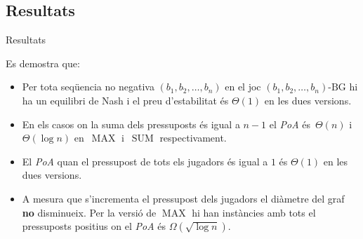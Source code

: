\documentclass[aspectratio=169]{beamer}
\DeclareMathOperator{\SUM}{SUM}
\DeclareMathOperator{\MAX}{MAX}
\begin{document}
\subsection{Resultats}
\begin{frame}[allowframebreaks]{Resultats}



Es demostra que:
\begin{itemize}
    \item Per tota seqüencia no negativa $ (b_1, b_2, \dots , b_n)$ en el joc $ (b_1, b_2, \dots , b_n)\text{-BG} $ hi ha un equilibri de Nash i el preu d'estabilitat és $\Theta(1)$ en les dues versions.
    
    \vspace{1em}
    
    \item En els casos on la suma dels pressuposts és igual a $n-1$ el \emph{PoA}
    és~$\Theta(n)$ i~$\Theta(\log n)$ en~$\MAX$ i~$\SUM$ respectivament.
    
    \vspace{1em}
    
    \item El \emph{PoA} quan el pressupost de tots els jugadors és igual a $1$ és $\Theta(1)$ en les dues versions.
    
    \vspace{1em}
    
    \item A mesura que s'incrementa el pressupost dels jugadors el diàmetre del graf \textbf{no} disminueix. Per la versió de $\MAX$ hi han instàncies amb tots el pressuposts positius on el \emph{PoA} és $\Omega(\sqrt{\log n})$.
    

\end{itemize}
\end{frame}
\end{document}
